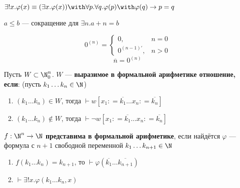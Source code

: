 \begin{definition}
    \(\exists !x.\varphi(x) \equiv (\exists x.\varphi(x)) \with \forall p.\forall q.\varphi(p) \with \varphi(q) \to p = q\)
\end{definition}

\begin{definition}
    \(a \leq b\) --- сокращение для \(\exists n.a + n = b\)
\end{definition}

\begin{definition}
    \[0^{(n)} = \begin{cases} 0, & n = 0 \\ 0^{(n - 1)'}, & n > 0 \end{cases}\]
    \[\overline n = 0^{(n)} \]
\end{definition}

\begin{definition}
    Пусть \(W \subset \N_0^n\). \(W\) --- \textbf{выразимое в формальной арифметике отношение, если}: (пусть \(k_1 \dots k_n \in \N\))
    \begin{enumerate}
        \item \((k_1\dots k_n)\in W\), тогда \(\vdash w[x_1: = \overline{k_1} \dots x_n: = \overline{k_n}]\)
        \item \((k_1\dots k_n)\notin W\), тогда \(\vdash \neg w[x_1: = \overline{k_1} \dots x_n: = \overline{k_n}]\)
    \end{enumerate}
\end{definition}

\begin{definition}
    \(f : \N^n \to \N\) \textbf{представима в формальной арифметике}, если найдётся \(\varphi\) --- формула с \(n + 1\) свободной переменной \(k_1 \dots k_{n+1} \in \N\)
    \begin{enumerate}
        \item \(f(k_1\dots k_n) = k_{n+1}\), то \(\vdash \varphi(\overline{k_1} \dots \overline{k_{n+1}})\)
        \item \(\vdash \exists ! x.\varphi(k_1 \dots k_n, x)\)
    \end{enumerate}
\end{definition}
